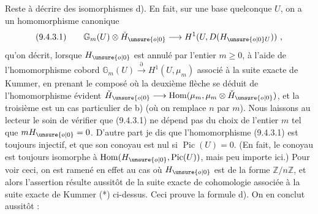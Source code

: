 Reste à décrire des isomorphismes d). En fait, sur une base quelconque $U$, on a un homomorphisme canonique
\[
 (9.4.3.1)\qquad \mathbb G_m(U)\otimes\check H_{\unsure{o|0}}\longrightarrow H^1(U,D(H_{\unsure{o|0}U}))\ ,
\]
qu'on décrit, lorsque $H_{\unsure{o|0}}$ est annulé par l'entier $m\geq0$, à l'aide de l'homomorphisme cobord $\mathbb G_m(U)\xrightarrow{\partial}H^1(U,\mu_m)$ associé à la suite exacte de Kummer, en prenant le composé
où la deuxième flèche se déduit de l'homomorphisme évident $\check H_{\unsure{o|0}}\longrightarrow\operatorname{Hom}(\mu_m,\mu_m\otimes\check H_{\unsure{o|0}})$, et la troisième est un cas particulier de b) (où on remplace $n$ par $m$). Nous laissons au lecteur le soin de vérifier que (9.4.3.1) ne dépend pas du choix de l'entier $m$ tel que $mH_{\unsure{o|0}}=0$.
D'autre part je dis que l'homomorphisme (9.4.3.1) est toujours injectif, et que son conoyau est nul si $\operatorname{Pic}(U)=0$. (En fait, le conoyau est toujours isomorphe à $\operatorname{Hom}(H_{\unsure{o|0}},\operatorname{Pic}(U))$, mais peu importe ici.) Pour voir ceci, on est ramené en effet au cas où $H_{\unsure{o|0}}$ est de la forme $\mathbb Z/n\mathbb Z$, et alors l'assertion résulte aussitôt de la suite exacte de cohomologie associée à la suite exacte de Kummer (*) ci-dessus. Ceci prouve la formule d). On en conclut aussitôt :


